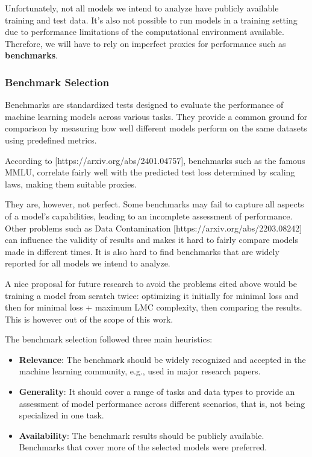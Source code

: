     Unfortunately, not all models we intend to analyze have publicly available training and test data. It's also not possible to run models in a training setting due to performance limitations of the computational environment available. Therefore, we will have to rely on imperfect proxies for performance such as \textbf{benchmarks}.

    \subsubsection{Benchmark Selection}
    \label{sec:benchmark_selection}

        Benchmarks are standardized tests designed to evaluate the performance of machine learning models across various tasks. They provide a common ground for comparison by measuring how well different models perform on the same datasets using predefined metrics. 
        
        According to [https://arxiv.org/abs/2401.04757], benchmarks such as the famous MMLU, correlate fairly well with the predicted test loss determined by scaling laws, making them suitable proxies.

        They are, however, not perfect. Some benchmarks may fail to capture all aspects of a model's capabilities, leading to an incomplete assessment of performance. Other problems such as Data Contamination [https://arxiv.org/abs/2203.08242] can influence the validity of results and makes it hard to fairly compare models made in different times. It is also hard to find benchmarks that are widely reported for all models we intend to analyze.

        A nice proposal for future research to avoid the problems cited above would be training a model from scratch twice: optimizing it initially for minimal loss and then for minimal loss + maximum LMC complexity, then comparing the results. This is however out of the scope of this work.

        The benchmark selection followed three main heuristics:
        \begin{itemize}
            \item \textbf{Relevance}: The benchmark should be widely recognized and accepted in the machine learning community, e.g., used in major research papers.
            \item \textbf{Generality}: It should cover a range of tasks and data types to provide an assessment of model performance across different scenarios, that is, not being specialized in one task.
            \item \textbf{Availability}: The benchmark results should be publicly available. Benchmarks that cover more of the selected models were preferred.
        \end{itemize}

